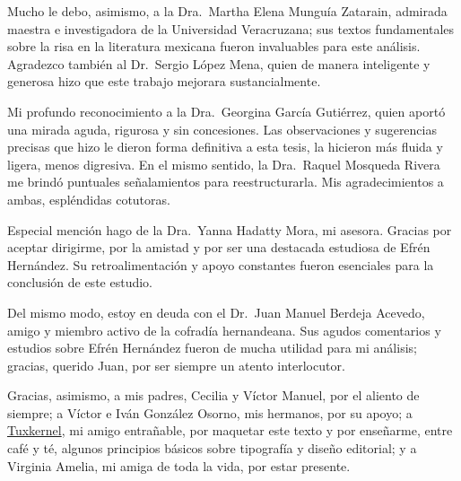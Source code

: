 \documentclass[14pt,twoside,final]{extbook} %
\begin{document}
Mucho le debo, asimismo, a la Dra.~Martha Elena Munguía Zatarain, admirada maestra e investigadora de la Universidad Veracruzana; sus textos fundamentales sobre la risa en la literatura mexicana fueron invaluables para este análisis. Agradezco también al Dr.~Sergio López Mena, quien de manera inteligente y generosa hizo que este trabajo mejorara sustancialmente.

Mi profundo reconocimiento a la Dra.~Georgina García Gutiérrez, quien aportó una mirada aguda, rigurosa y sin concesiones. Las observaciones y sugerencias precisas que hizo le dieron forma definitiva a esta tesis, la hicieron más fluida y ligera, menos digresiva. En el mismo sentido, la Dra.~Raquel Mosqueda Rivera me brindó puntuales señalamientos para reestructurarla. Mis agradecimientos a ambas, espléndidas cotutoras.

Especial mención hago de la Dra.~Yanna Hadatty Mora, mi asesora. Gracias por aceptar dirigirme, por la amistad y por ser una destacada estudiosa de Efrén Hernández. Su retroalimentación y apoyo constantes fueron esenciales para la conclusión de este estudio.

Del mismo modo, estoy en deuda con el Dr.~Juan Manuel Berdeja Acevedo, amigo y miembro activo de la cofradía hernandeana. Sus agudos comentarios y estudios sobre Efrén Hernández fueron de mucha utilidad para mi análisis; gracias, querido Juan, por ser siempre un atento interlocutor.

Gracias, asimismo, a mis padres, Cecilia y Víctor Manuel, por el aliento de siempre; a Víctor e Iván González Osorno, mis hermanos, por su apoyo; a \href{muxkernel@gmail.com}{Tuxkernel}, mi amigo entrañable, por maquetar este texto y por enseñarme, entre café y té, algunos principios básicos sobre tipografía y diseño editorial; y a Virginia Amelia, mi amiga de toda la vida, por estar presente.
\end{document}
